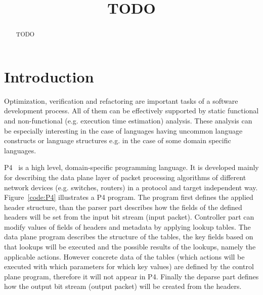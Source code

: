 \documentclass[sigconf]{acmart}
\begin{document}
	
	
	\title{TODO}
	
	
	\author{}
	\email{}
	\orcid{}
	\author{}
	\authornotemark[]
	\email{}
	\affiliation{%
		\institution{}
		\streetaddress{}
		\city{}
		\state{}
		\country{}
		\postcode{}
	}
	
	
	\begin{abstract}
		TODO
	\end{abstract}
	

	
	
	
	\maketitle
	
	\section{Introduction}
	  Optimization, verification and refactoring are important tasks of a software development process. All of them can be effectively supported by static functional and non-functional (e.g. execution time estimation) analysis. These analysis can be especially interesting in the case of languages having uncommon language constructs or language structures e.g. in the case of some domain specific languages. 
	
	
	P4~\cite{p4paper} is a high level, domain-specific programming language. It is developed mainly for
describing the data plane layer of packet processing algorithms of different network
devices (e.g. switches, routers) in a protocol and target independent way. Figure~\ref{code:P4} illustrates a P4 program. The program first defines the applied header structure, than the parser part describes how the fields of the defined headers will be set from the input bit stream (input packet). Controller part can modify values of fields of headers and metadata by applying lookup tables. The data plane program describes the structure of the tables, the key fields based on that lookups will be executed and the possible results of the lookups, namely the applicable actions. However concrete data of the tables (which actions will be executed with which parameters for which key values) are defined by the control plane program, therefore it will not appear in P4. Finally the deparse part defines how the output bit stream (output packet) will be created from the headers.   
	
\end{document}
